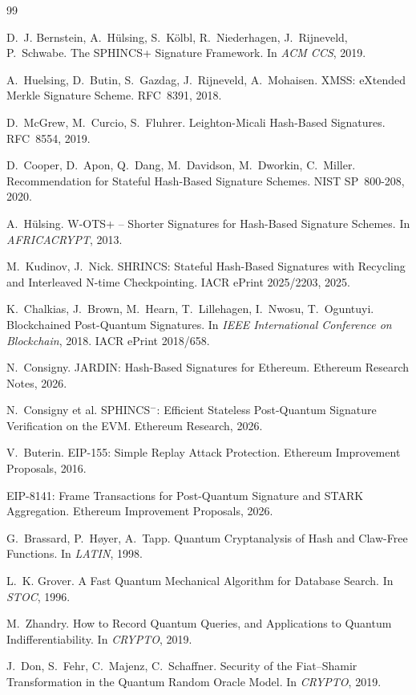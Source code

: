 \documentclass[11pt]{article}
\begin{document}

\begin{thebibliography}{99}

D.~J. Bernstein, A.~H\"ulsing, S.~K\"olbl, R.~Niederhagen,
J.~Rijneveld, P.~Schwabe.
\newblock The SPHINCS+ Signature Framework.
\newblock In \emph{ACM CCS}, 2019.

A.~Huelsing, D.~Butin, S.~Gazdag, J.~Rijneveld, A.~Mohaisen.
\newblock XMSS: eXtended Merkle Signature Scheme.
\newblock RFC~8391, 2018.

D.~McGrew, M.~Curcio, S.~Fluhrer.
\newblock Leighton-Micali Hash-Based Signatures.
\newblock RFC~8554, 2019.

D.~Cooper, D.~Apon, Q.~Dang, M.~Davidson, M.~Dworkin, C.~Miller.
\newblock Recommendation for Stateful Hash-Based Signature Schemes.
\newblock NIST SP~800-208, 2020.

A.~H\"ulsing.
\newblock W-OTS+ -- Shorter Signatures for Hash-Based Signature Schemes.
\newblock In \emph{AFRICACRYPT}, 2013.

M.~Kudinov, J.~Nick.
\newblock SHRINCS: Stateful Hash-Based Signatures with Recycling and
Interleaved N-time Checkpointing.
\newblock IACR ePrint 2025/2203, 2025.

K.~Chalkias, J.~Brown, M.~Hearn, T.~Lillehagen, I.~Nwosu, T.~Oguntuyi.
\newblock Blockchained Post-Quantum Signatures.
\newblock In \emph{IEEE International Conference on Blockchain}, 2018.
\newblock IACR ePrint 2018/658.

N.~Consigny.
\newblock JARDIN: Hash-Based Signatures for Ethereum.
\newblock Ethereum Research Notes, 2026.

N.~Consigny et al.
\newblock SPHINCS$^-$: Efficient Stateless Post-Quantum Signature
Verification on the EVM.
\newblock Ethereum Research, 2026.

V.~Buterin.
\newblock EIP-155: Simple Replay Attack Protection.
\newblock Ethereum Improvement Proposals, 2016.

EIP-8141: Frame Transactions for Post-Quantum Signature and STARK
Aggregation.
\newblock Ethereum Improvement Proposals, 2026.

G.~Brassard, P.~H{\o}yer, A.~Tapp.
\newblock Quantum Cryptanalysis of Hash and Claw-Free Functions.
\newblock In \emph{LATIN}, 1998.

L.~K. Grover.
\newblock A Fast Quantum Mechanical Algorithm for Database Search.
\newblock In \emph{STOC}, 1996.

M.~Zhandry.
\newblock How to Record Quantum Queries, and Applications to Quantum
Indifferentiability.
\newblock In \emph{CRYPTO}, 2019.

J.~Don, S.~Fehr, C.~Majenz, C.~Schaffner.
\newblock Security of the Fiat--Shamir Transformation in the Quantum
Random Oracle Model.
\newblock In \emph{CRYPTO}, 2019.

\end{thebibliography}
\end{document}
